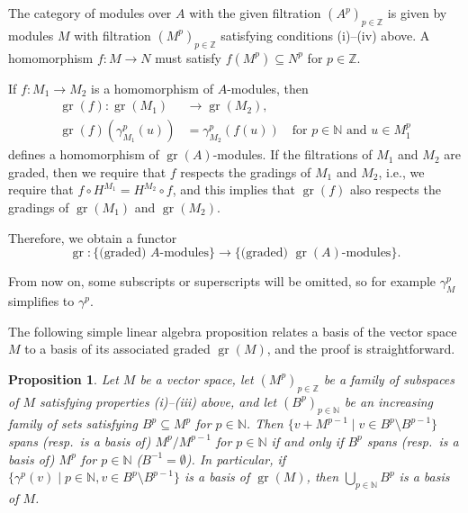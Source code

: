 \documentclass[a4paper, 12pt, reqno]{amsart}
\newtheorem{proposition}[theorem]{Proposition}
\theoremstyle{remark}
\DeclareMathOperator{\gr}{gr}
\begin{document}
The category of modules over $A$ with the given filtration $(A^p)_{p \in \mathbb{Z}}$ is given by modules $M$ with filtration $(M^p)_{p \in \mathbb{Z}}$ satisfying conditions (i)--(iv) above.
A homomorphism $f: M \to N$ must satisfy $f(M^p) \subseteq N^p$ for $p \in \mathbb{Z}$.

If $f: M_1 \to M_2$ is a homomorphism of $A$-modules, then
\begin{align*}
  \gr(f): \gr(M_1) &\to \gr(M_2), \\
  \gr(f)(\gamma_{M_1}^p(u)) &= \gamma_{M_2}^p(f(u)) \quad \text{for $p \in \mathbb{N}$ and $u \in M_1^p$}
\end{align*}
defines a homomorphism of $\gr(A)$-modules.
If the filtrations of $M_1$ and $M_2$ are graded, then we require that $f$ respects the gradings of $M_1$ and $M_2$, i.e., we require that $f\circ H^{M_1} = H^{M_2}\circ f$, and this implies that $\gr(f)$ also respects the gradings of $\gr(M_1)$ and $\gr(M_2)$.

Therefore, we obtain a functor
\begin{equation*}
  \gr: \{\text{(graded) $A$-modules}\} \to \{\text{(graded) $\gr(A)$-modules}\}.
\end{equation*}

From now on, some subscripts or superscripts will be omitted, so for example $\gamma^p_M$ simplifies to $\gamma^p$.

The following simple linear algebra proposition relates a basis of the vector space $M$ to a basis of its associated graded $\gr(M)$, and the proof is straightforward.

\begin{proposition}
  \label{prp:1}
  Let $M$ be a vector space, let $(M^p)_{p \in \mathbb{Z}}$ be a family of subspaces of $M$ satisfying properties \emph{(i)--(iii)} above, and let $(B^p)_{p \in \mathbb{N}}$ be an increasing family of sets satisfying $B^p \subseteq M^p$ for $p \in \mathbb{N}$.
  Then $\{v + M^{p - 1} \mid v \in B^p \setminus B^{p - 1}\}$ spans (resp.\ is a basis of) $M^p/M^{p - 1}$ for $p \in \mathbb{N}$ if and only if $B^p$ spans (resp.\ is a basis of) $M^p$ for $p \in \mathbb{N}$ ($B^{-1} = \emptyset$).
  In particular, if $\{\gamma^p(v) \mid p \in \mathbb{N}, v \in B^p \setminus B^{p - 1}\}$ is a basis of $\gr(M)$, then $\bigcup_{p \in \mathbb{N}}B^p$ is a basis of $M$.
\end{proposition}
\end{document}
